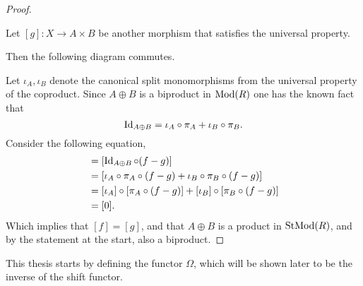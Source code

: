 \begin{proof}
\begin{center}
    \end{center}
    Let \( [g]: X \to A \times B \) be another morphism that satisfies the universal property.

    Then the following diagram commutes.
    \begin{center}
    \end{center}

    Let \( \iota_A, \iota_B \) denote the canonical split monomorphisms from the universal property of the coproduct. Since \( A \oplus B \) is a biproduct in \( \operatorname{Mod}(R) \) one has the known fact that
    \[
        \operatorname{Id}_{A \oplus B} = \iota_A \circ \pi_A + \iota_B \circ \pi_B.
    \]
    Consider the following equation,
    \begin{align*}
        [f - g] &= [\Id_{A \oplus B} \circ (f - g)] \\
        &= [\iota_A \circ \pi_A \circ (f - g) + \iota_B \circ \pi_B \circ (f - g)] \\
        &= [\iota_A] \circ [\pi_A \circ (f - g)] + [\iota_B] \circ [\pi_B \circ (f - g)] \\
        &= [0].
    \end{align*}
    Which implies that \( [f] = [g] \), and that \( A \oplus B \) is a product in \( \operatorname{StMod}(R) \), and by the statement at the start, also a biproduct.
\end{proof}

This thesis starts by defining the functor \( \Omega \), which will be shown later to be the inverse of the shift functor.

